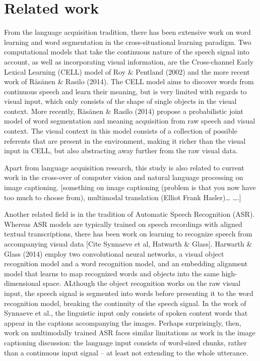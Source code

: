 \section{Related work}
From the language acquisition tradition, there has been extensive work on word learning and word segmentation in the cross-situational learning paradigm. %
Two computational models that take the continuous nature of the speech signal into account, as well as incorporating visual information, are the Cross-channel Early Lexical Learning (CELL) model of Roy \& Pentland (2002) %
and the more recent work of Räsänen \& Rasilo (2014). %
The CELL model aims to discover words from continuous speech and learn their meaning, but is very limited with regards to visual input, which only consists of the shape of single objects in the visual context. More recently, Räsänen \& Rasilo (2014) %
propose a probabilistic joint model of word segmentation and meaning acquisition from raw speech and visual context. The visual context in this model consists of a collection of possible referents that are present in the environment, making it richer than the visual input in CELL, but also abstracting away further from the raw visual data. 

Apart from language acquisition research, this study is also related to current work in the cross-over of computer vision and natural language processing on image captioning. [something on image captioning (problem is that you now have too much to choose from), multimodal translation (Elliot Frank Hasler)… ….]

Another related field is in the tradition of Automatic Speech Recognition (ASR). Whereas ASR models are typically trained on speech recordings with aligned textual transcriptions, there has been work on learning to recognize speech from accompanying visual data [Cite Synnaeve et al, Hatwarth \& Glass].%
Harwarth \& Glass (2014) %
employ two convolutional neural networks, a visual object recognition model and a word recognition model, and an embedding alignment model that learns to map recognized words and objects into the same high-dimensional space. ALthough the object recognition works on the raw visual input, the speech signal is segmented into words before presenting it to the word recognition model, breaking the continuity of the speech signal. In the work of Synnaeve et al., %
the linguistic input only consists of spoken content words that appear in the captions accompanying the images. Perhaps surprisingly, then, work on multimodally trained ASR faces similar limitations as work in the image captioning discussion: the language input consists of word-sized chunks, rather than a continuous input signal – at least not extending to the whole utterance.


